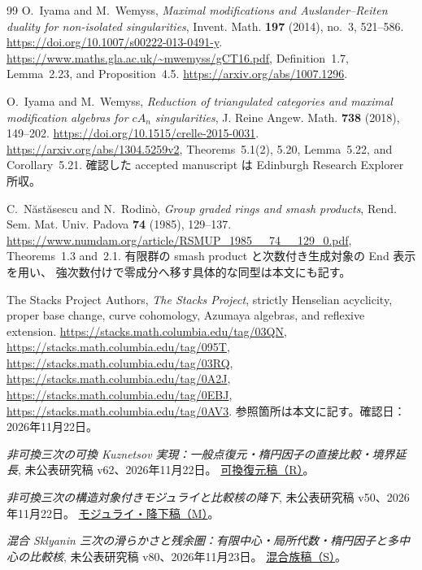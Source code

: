 \begin{thebibliography}{99}
O.~Iyama and M.~Wemyss,
\emph{Maximal modifications and Auslander--Reiten duality
for non-isolated singularities},
Invent. Math. \textbf{197} (2014), no.~3, 521--586.
\url{https://doi.org/10.1007/s00222-013-0491-y}.
\url{https://www.maths.gla.ac.uk/~mwemyss/gCT16.pdf},
Definition~1.7, Lemma~2.23, and Proposition~4.5.
\url{https://arxiv.org/abs/1007.1296}.

O.~Iyama and M.~Wemyss,
\emph{Reduction of triangulated categories and maximal modification
algebras for $cA_n$ singularities},
J. Reine Angew. Math. \textbf{738} (2018), 149--202.
\url{https://doi.org/10.1515/crelle-2015-0031}.
\url{https://arxiv.org/abs/1304.5259v2},
Theorems~5.1(2), 5.20, Lemma~5.22, and Corollary~5.21.
確認した accepted manuscript は Edinburgh Research Explorer 所収。

C.~N\u{a}st\u{a}sescu and N.~Rodin\`o,
\emph{Group graded rings and smash products},
Rend. Sem. Mat. Univ. Padova \textbf{74} (1985), 129--137.
\url{https://www.numdam.org/article/RSMUP_1985__74__129_0.pdf},
Theorems~1.3 and~2.1.
有限群の smash product と次数付き生成対象の End 表示を用い、
強次数付けで零成分へ移す具体的な同型は本文にも記す。

The Stacks Project Authors,
\emph{The Stacks Project},
strictly Henselian acyclicity, proper base change, curve cohomology,
Azumaya algebras, and reflexive extension.
\url{https://stacks.math.columbia.edu/tag/03QN},
\url{https://stacks.math.columbia.edu/tag/095T},
\url{https://stacks.math.columbia.edu/tag/03RQ},
\url{https://stacks.math.columbia.edu/tag/0A2J},
\url{https://stacks.math.columbia.edu/tag/0EBJ},
\url{https://stacks.math.columbia.edu/tag/0AV3}.
参照箇所は本文に記す。確認日：2026年11月22日。


\emph{非可換三次の可換 Kuznetsov 実現：一般点復元・楕円因子の直接比較・境界延長},
未公表研究稿 v62、2026年11月22日。
\href{https://github.com/uedakazushi/nc-cubic/blob/main/papers/nc-cubic.tex}{可換復元稿（R）}。

\emph{非可換三次の構造対象付きモジュライと比較核の降下},
未公表研究稿 v50、2026年11月22日。
\href{https://github.com/uedakazushi/nc-cubic/blob/main/papers/cubic-moduli-descent.tex}{モジュライ・降下稿（M）}。

\emph{混合 Sklyanin 三次の滑らかさと残余圏：有限中心・局所代数・楕円因子と多中心の比較核},
未公表研究稿 v80、2026年11月23日。
\href{https://github.com/uedakazushi/nc-cubic/blob/main/papers/mixed-sklyanin-cubics.tex}{混合族稿（S）}。


\end{thebibliography}
